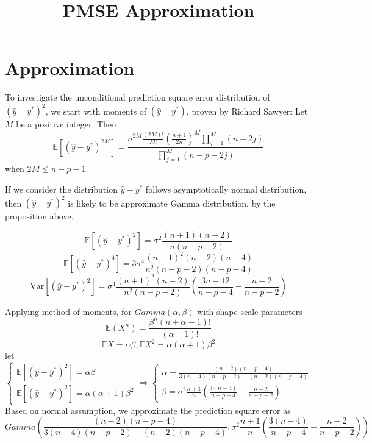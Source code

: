 \documentclass[11pt]{article}
\title{PMSE Approximation}
\newcommand{\E}{\mathbb{E}}
\newcommand{\Var}{\mathrm{Var}}
\begin{document}
\maketitle

\section{Approximation}
To investigate the unconditional prediction square error distribution of $(\hat{y}-y^*)^2$, we start with moments of $(\hat{y}-y^*)$, proven by Richard Sawyer:
Let $M$ be a positive integer. Then 
$$\E\left[(\hat{y}-y^*)^{2M}\right] = \frac{\sigma^{2M}\frac{(2M)!}{M!}\left(\frac{n+1}{2n}\right)^M\prod^M_{j=1}(n-2j)}{\prod^M_{j=1}(n-p-2j)}$$
when $2M\leq n-p-1$.

If we consider the distribution $\hat{y}-y^*$ follows asymptotically normal distribution, then $(\hat{y}-y^*)^{2}$ is likely to be approximate Gamma distribution, by the proposition above, 

\begin{equation}\label{MSE}
\E\left[(\hat{y}-y^*)^{2}\right]=\sigma^2\frac{(n+1)(n-2)}{n(n-p-2)}\end{equation}
\begin{equation}\E\left[(\hat{y}-y^*)^{4}\right] =3\sigma^4\frac{(n+1)^2(n-2)(n-4)}{n^2(n-p-2)(n-p-4)}\end{equation}
\begin{equation}\label{VarSE}
\Var\left[(\hat{y}-y^*)^{2}\right]= \sigma^4 \frac{(n+1)^2 (n-2)}{n^2(n-p-2)}\left(\frac{3n-12}{n-p-4}-\frac{n-2}{n-p-2}\right)\end{equation}

Applying method of moments, for $Gamma(\alpha,\beta)$ with shape-scale parameters
$$\E(X^n)=\frac{\beta^n(n+\alpha-1)!}{(\alpha-1)!}$$
$$\E X=\alpha\beta, \E X^2 = \alpha(\alpha+1)\beta^2$$
let
$$\begin{cases}\E\left[(\hat{y}-y^*)^{2}\right]=\alpha\beta\\
\E\left[(\hat{y}-y^*)^{2}\right]=\alpha(\alpha+1)\beta^2\end{cases}
\Rightarrow
\begin{cases}
\alpha = \frac{(n-2)(n-p-4)}{3(n-4)(n-p-2)-(n-2)(n-p-4)}\\
\beta = \sigma^2\frac{n+1}{n}\left(\frac{3(n-4)}{n-p-4}-\frac{n-2}{n-p-2}\right)
\end{cases}$$
Based on normal assumption, we approximate the prediction square error as 
\begin{equation}\label{gamma}
Gamma\left(\frac{(n-2)(n-p-4)}{3(n-4)(n-p-2)-(n-2)(n-p-4)},\sigma^2\frac{n+1}{n}\left(\frac{3(n-4)}{n-p-4}-\frac{n-2}{n-p-2}\right)\right)\end{equation}
\end{document}
